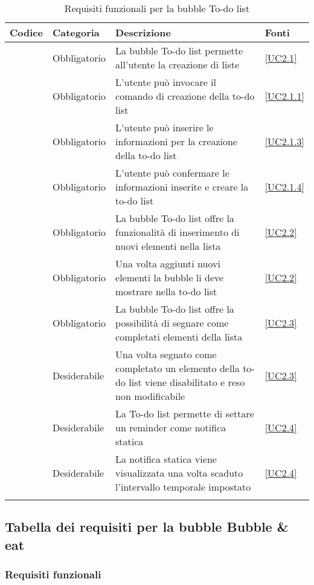 \begin{longtable}{|P{1.5cm}|P{2.5cm}|P{6.5cm}|P{2.5cm}|}
	\hline \textbf{Codice} & \textbf{Categoria} & \textbf{Descrizione} & \textbf{Fonti} \\
	\hline \RequisitoObF\label{L17} & Obbligatorio & La bubble To-do list permette all'utente la creazione di liste & \ref{UC2.1} \\
	\hline \RequisitoObF\label{L71} & Obbligatorio & L'utente può invocare il comando di creazione della to-do list & \ref{UC2.1.1} \\
	\hline \RequisitoObF\label{L72} & Obbligatorio & L'utente può inserire le informazioni per la creazione della to-do list & \ref{UC2.1.3} \\
	\hline \RequisitoObF\label{L73} & Obbligatorio & L'utente può confermare le informazioni inserite e creare la to-do list & \ref{UC2.1.4} \\
	\hline \RequisitoObF\label{L18} & Obbligatorio & La bubble To-do list offre la funzionalità di inserimento di nuovi elementi nella lista & \ref{UC2.2} \\
	\hline \RequisitoObF\label{L74} & Obbligatorio & Una volta aggiunti nuovi elementi la bubble li deve mostrare nella to-do list & \ref{UC2.2} \\
	\hline \RequisitoObF\label{L19} & Obbligatorio & La bubble To-do list offre la possibilità di segnare come completati elementi della lista & \ref{UC2.3} \\
	\hline \RequisitoDF\label{L75} & Desiderabile & Una volta segnato come completato un elemento della to-do list viene disabilitato e reso non modificabile & \ref{UC2.3} \\
	\hline \RequisitoDF\label{L20} & Desiderabile & La To-do list permette di settare un reminder come notifica statica & \ref{UC2.4} \\
	\hline \RequisitoDF\label{L76} & Desiderabile & La notifica statica viene visualizzata una volta scaduto l'intervallo temporale impostato & \ref{UC2.4} \\
	\hline
	\caption{Requisiti funzionali per la bubble To-do list}
\end{longtable}

\subsection{Tabella dei requisiti per la bubble Bubble \& eat}

\subsubsection{Requisiti funzionali}

